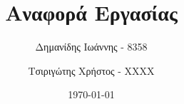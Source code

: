 

\subject{Συστήματα Πολυμέσων και Εικονική Πραγματικότητα}
\title{Αναφορά Εργασίας}
\author{%
	Δημανίδης Ιωάννης - 8358
	\and Τσιριγώτης Χρήστος - ΧΧΧΧ
}
\date{\vspace{10cm}\today}


	\pagestyle{empty}

	\maketitle

	\clearpage


	\clearpage
	\pagestyle{scrheadings}
	\setcounter{page}{1}

	
	
	
	
	


